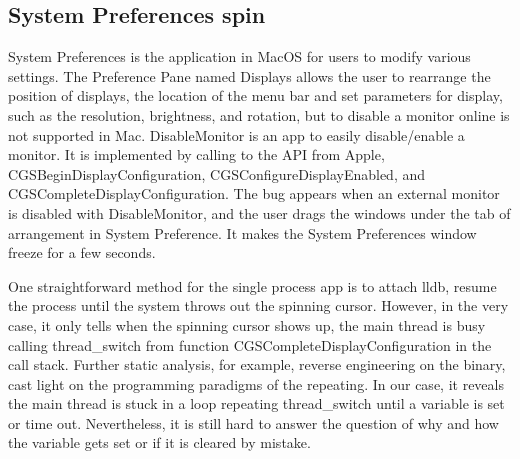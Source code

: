 \subsection{System Preferences spin}
System Preferences is the application in MacOS for users to modify various settings.                                        
The Preference Pane named Displays allows the user to rearrange the position of displays,                                   
the location of the menu bar and set parameters for display, such as the resolution, brightness, and rotation,              
but to disable a monitor online is not supported in Mac.                                                                    
DisableMonitor is an app to easily disable/enable a monitor.                                                                
It is implemented by calling to the API from Apple, CGSBeginDisplayConfiguration, CGSConfigureDisplayEnabled, and CGSCompleteDisplayConfiguration.
The bug appears when an external monitor is disabled with DisableMonitor, and the user drags the windows under the tab of arrangement in System Preference.
It makes the System Preferences window freeze for a few seconds.

One straightforward method for the single process app is to attach lldb, resume the process until the system throws out the spinning cursor.
However, in the very case, it only tells when the spinning cursor shows up, the main thread is busy calling thread\_switch from function CGSCompleteDisplayConfiguration in the call stack.
Further static analysis, for example, reverse engineering on the binary, cast light on the programming paradigms of the repeating.
In our case, it reveals the main thread is stuck in a loop repeating thread\_switch until a variable is set or time out.
Nevertheless, it is still hard to answer the question of why and how the variable gets set or if it is cleared by mistake.

